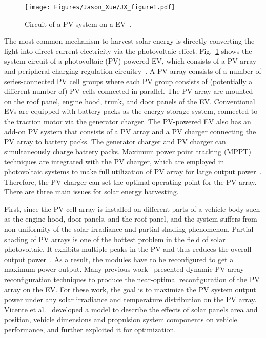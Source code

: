\begin{figure}
\centering
\texttt{[image: Figures/Jason\_Xue/JX\_figure1.pdf]}
\caption{Circuit of a PV system on a EV~\cite{JX_68}.}
\label{JX_image1}
\end{figure}      

The most common mechanism to harvest solar energy is directly converting the light into direct current electricity via the photovoltaic effect. Fig.~\ref{JX_image1} shows the system circuit of a photovoltaic (PV) powered EV, which consists of a PV array and peripheral charging regulation circuitry~\cite{JX_68,JX_34}. A PV array consists of a number of series-connected PV cell groups where each PV group consists of (potentially a different number of) PV cells connected in parallel. The PV array are mounted on the roof panel, engine hood, trunk, and door panels of the EV. Conventional EVs are equipped with battery packs as the energy storage system, connected to the traction motor via the generator charger. The PV-powered EV also has an add-on PV system that consists of a PV array and a PV charger connecting the PV array to battery packs. The generator charger and PV charger can simultaneously charge battery packs. Maximum power point tracking (MPPT) techniques are integrated with the PV charger, which are employed in photovoltaic systems to make full utilization of PV array for large output power~\cite{JX_5,JX_41,JX_47}. Therefore, the PV charger can set the optimal operating point for the PV array. There are three main issues for solar energy harvesting.

First, since the PV cell array is installed on different parts of a vehicle body such as the engine hood, door panels, and the roof panel, and the system suffers from non-uniformity of the solar irradiance and partial shading phenomenon. Partial shading of PV arrays is one of the hottest problem in the field of solar photovoltaic. It exhibits multiple peaks in the PV and thus reduces the overall output power~\cite{JX_57}. As a result, the modules have to be reconfigured to get a maximum power output. Many previous work~\cite{JX_6,JX_34,JX_64,JX_68} presented dynamic PV array reconfiguration techniques to produce the near-optimal reconfiguration of the PV array on the EV. For these work, the goal is to maximize the PV system output power under any solar irradiance and temperature distribution on the PV array. Vicente et al.~\cite{JX_66} developed a model to describe the effects of solar panels area and position, vehicle dimensions and propulsion system components on vehicle performance, and further exploited it for optimization.

